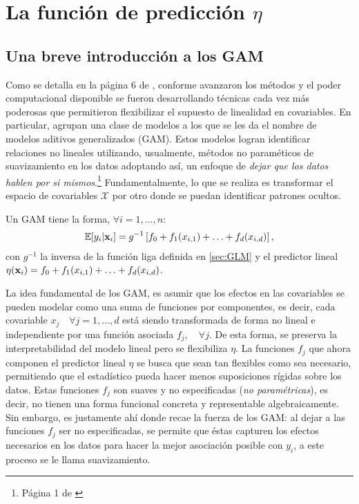 \documentclass[../Main/Main.tex]{subfiles}
\begin{document}
\section{La función de predicción $\eta$} \label{sec:FuncPred} 
\subsection{Una breve introducción a los GAM}
Como se detalla en la página 6 de \citet{james2013introduction}, conforme avanzaron los métodos y el poder computacional disponible se fueron desarrollando técnicas cada vez más poderosas que permitieron flexibilizar el supuesto de linealidad en covariables. En particular, \citeauthor{hastie1990generalized} agrupan una clase de modelos a los que se les da el nombre de modelos aditivos generalizados (GAM). Estos modelos logran identificar relaciones no lineales utilizando, usualmente, métodos no paraméticos de suavizamiento en los datos  adoptando así, un enfoque de \textit{dejar que los datos hablen por si mismos}.\footnote{Página 1 de \citet{hastie1990generalized}} Fundamentalmente, lo que se realiza es transformar el espacio de covariables $\mathcal{X}$ por otro donde se puedan identificar patrones ocultos.\\

\begin{definition} \label{def:GAM}
Un GAM tiene la forma, $\forall i =1,\ldots,n$:
\begin{align}
	\mathbb{E}[y_i|\mathbf{x}_i] = g^{-1}\left[f_0 + f_1(x_{i,1}) + \ldots + f_d(x_{i,d})\right],\label{ec:GAM}
\end{align}
con $g^{-1}$ la inversa de la función liga definida en \eqref{sec:GLM} y el predictor lineal $\eta(\mathbf{x}_i) = f_0 + f_1(x_{i,1}) + \ldots + f_d(x_{i,d})$. 
\end{definition}

La idea fundamental de los GAM, es asumir que los efectos en las covariables se pueden modelar como una suma de funciones por componentes, es decir, cada covariable $x_j \quad \forall j =1,\ldots,d$ está siendo transformada de forma no lineal e independiente por una función asociada $f_j, \quad \forall j$. De esta forma, se preserva la interpretabilidad del modelo lineal pero se flexibiliza $\eta$. La funciones $f_j$ que ahora componen el predictor lineal $\eta$ se busca que sean tan flexibles como sea necesario, permitiendo que el estadístico pueda hacer menos suposiciones rígidas sobre los datos. Estas funciones $f_j$ son suaves y no especificadas (\textit{no paramétricas}), es decir, no tienen una forma funcional concreta y representable algebraicamente. Sin embargo, es justamente ahí donde recae la fuerza de los GAM: al dejar a las funciones $f_j$ ser no especificadas, se permite que éstas capturen los efectos necesarios en los datos para hacer la mejor asociación posible con $y_i$, a este proceso se le llama suavizamiento. 
\end{document}
